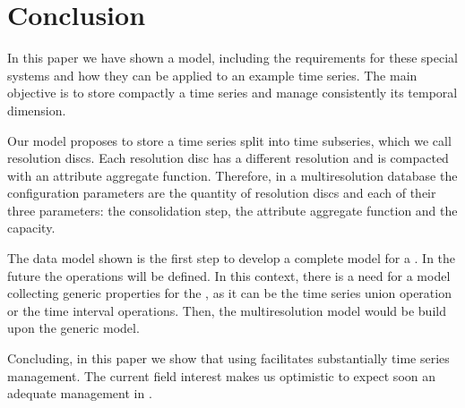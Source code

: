 \section{Conclusion} 
\label{sec:concl-future-work}

In this paper we have shown a  model, including the
requirements for these special systems and how they can be applied to
an example time series. The main objective is to store compactly a
time series and manage consistently its temporal dimension.

Our  model proposes to store a time series split into time
subseries, which we call resolution discs.  Each resolution disc has a
different resolution and is compacted with an attribute aggregate
function. Therefore, in a multiresolution database the configuration
parameters are the quantity of resolution discs and each of their
three parameters: the consolidation step, the attribute aggregate
function and the capacity.

The data model shown is the first step to develop a complete model for
a . In the future the operations will be defined. In this
context, there is a need for a model collecting generic properties for
the , as it can be the time series union operation or the
time interval operations. Then, the multiresolution model would be
build upon the generic  model.

Concluding, in this paper we show that using  facilitates
substantially time series management. The current field interest makes
us optimistic to expect soon an adequate management in .


